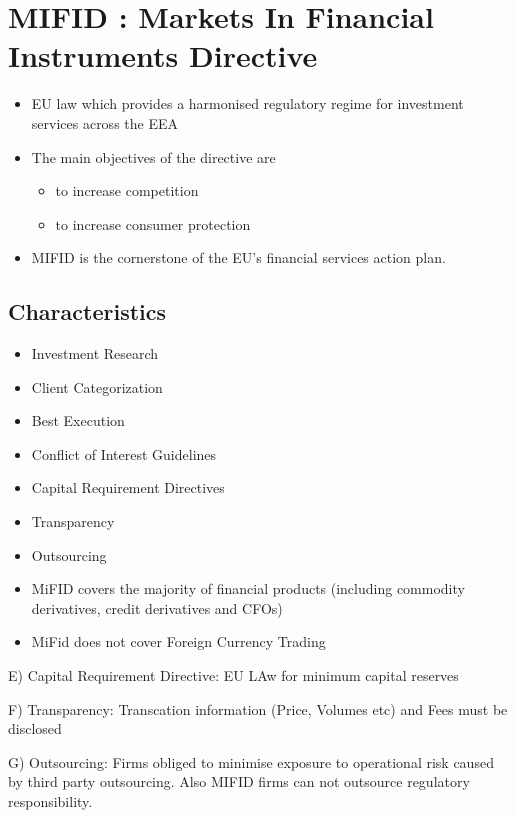 \section{MIFID : Markets In Financial Instruments Directive}

\begin{itemize}
\item EU law which provides a harmonised regulatory regime for investment services across the EEA

\item The main objectives of the directive are

\begin{itemize}
\item to increase competition
\item to increase consumer protection
\end{itemize}

\item MIFID is the cornerstone of the EU's financial services action plan.

\end{itemize}
\subsection{Characteristics}
\begin{itemize}
\item Investment Research
\item Client Categorization
\item Best Execution
\item Conflict of Interest Guidelines
\item Capital Requirement Directives
\item Transparency
\item Outsourcing
\end{itemize}

\begin{itemize}
\item MiFID covers the majority of financial products (including commodity derivatives, credit derivatives and CFOs)
\item MiFid does not cover Foreign Currency Trading
\end{itemize}

E) Capital Requirement Directive: EU LAw for minimum capital reserves

F) Transparency: Transcation information (Price, Volumes etc) and Fees must be disclosed

G) Outsourcing: Firms obliged to minimise exposure to operational risk caused by third party outsourcing. Also MIFID firms can not outsource regulatory responsibility.

